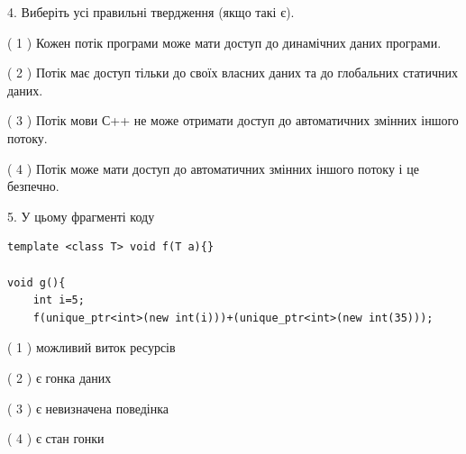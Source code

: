\documentclass[12pt, ukrainian]{article}
\begin{document}
\begin {large}
{%
4. Виберіть усі правильні твердження (якщо такі є).\par
\vspace{2mm}

( 1 ) Кожен потік програми може мати доступ до динамічних даних програми.%

( 2 ) Потік має доступ тільки до своїх власних даних та до глобальних статичних даних.%

( 3 ) Потік мови С++ не може отримати доступ до автоматичних змінних іншого потоку.%

( 4 ) Потік може мати доступ до автоматичних змінних іншого потоку і це безпечно.%


5. У цьому фрагменті коду
\begin{verbatim}
template <class T> void f(T a){}

void g(){
    int i=5;
    f(unique_ptr<int>(new int(i)))+(unique_ptr<int>(new int(35)));
\end{verbatim}
( 1 ) можливий виток ресурсів%

( 2 ) є гонка даних%

( 3 ) є невизначена поведінка%

( 4 ) є стан гонки%
}
\end {large}

\newpage
\end{document}
